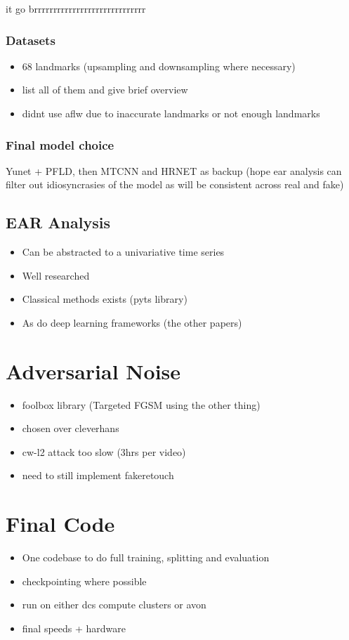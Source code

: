 it go brrrrrrrrrrrrrrrrrrrrrrrrrrrrr

\subsubsection{Datasets}

\begin{itemize}
    \item 68 landmarks (upsampling and downsampling where necessary)
    \item list all of them and give brief overview
    \item didnt use aflw due to inaccurate landmarks or not enough landmarks
\end{itemize}

\subsubsection{Final model choice}

Yunet + PFLD, then MTCNN and HRNET as backup (hope ear analysis can filter out idiosyncrasies of the model as will be consistent across real and fake)

\subsection{EAR Analysis}

\begin{itemize}
    \item Can be abstracted to a univariative time series
    \item Well researched
    \item Classical methods exists (pyts library)
    \item As do deep learning frameworks (the other papers)
\end{itemize}

\section{Adversarial Noise}

\begin{itemize}
    \item foolbox library (Targeted FGSM using the other thing)
    \item chosen over cleverhans
    \item cw-l2 attack too slow (3hrs per video)
    \item need to still implement fakeretouch
\end{itemize}

\section{Final Code}

\begin{itemize}
    \item One codebase to do full training, splitting and evaluation
    \item checkpointing where possible
    \item run on either dcs compute clusters or avon
    \item final speeds + hardware
\end{itemize}